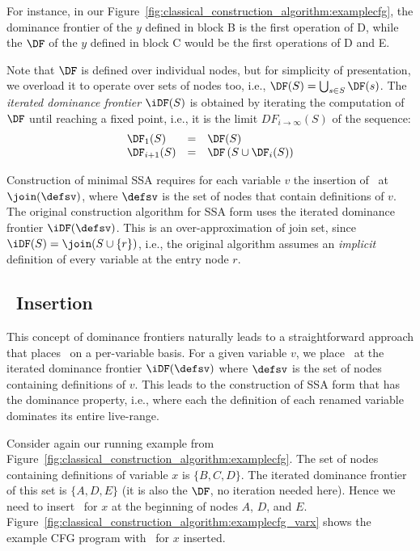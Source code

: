 {For instance, in our 
Figure~\ref{fig:classical_construction_algorithm:examplecfg}, the dominance 
frontier of the $y$ defined in block B is the first operation of D, while the 
$\DF$ of the $y$ defined in block C would be the first operations 
of D and E.


Note that $\DF$ is defined over individual nodes, 
but for simplicity of presentation, we overload it to 
operate over sets of nodes too, i.e., 
$\DF(S) = \bigcup_{s\in S} \DF(s)$.
The \textit{iterated dominance frontier} $\iDF(S)$ is obtained by iterating the computation of $\DF$ until 
reaching a fixed point, i.e., it is the limit 
$DF_{i\rightarrow\infty}(S)$
of the sequence:
$$\begin{array}{lll}
\DF_1(S) & = & \DF(S)\\
\DF_{i+1}(S) & = & \DF\left(S\cup \DF_i(S)\right)
\end{array}$$


Construction of minimal SSA 
requires for each variable $v$ the insertion of \phifuns\ at $\join(\defsv)$,
where $\defsv$ is the set of nodes that contain definitions of $v$.
The original construction algorithm
for SSA form uses the iterated dominance frontier $\iDF(\defsv)$.
This is an over-approximation of join set, since
$\iDF(S)=\join(S\cup \{r\})$,
i.e., the original algorithm assumes an \emph{implicit} definition of every
variable at the entry node $r$.


\subsection{\phifun\ Insertion}

This concept of dominance frontiers 
naturally leads to a
straightforward approach that places \phifuns\
on a per-variable basis.
For a given variable $v$, we place \phifuns\ at the
iterated dominance frontier $\iDF(\defsv)$ where
$\defsv$ is the set of nodes containing definitions of $v$.
This leads to the construction of SSA form that has 
the dominance property, i.e., where each the 
definition of each renamed variable dominates its entire live-range.

Consider again our running example from Figure~\ref{fig:classical_construction_algorithm:examplecfg}. The set of nodes containing definitions
of variable
$x$ is $\{ B,C,D \}$. The iterated dominance frontier of this set 
is $\{ A, D, E \}$ (it is also the $\DF$, no iteration needed here). Hence we need to insert 
\phifuns\ for $x$ at the beginning of nodes $A$, $D$, and $E$.
Figure~\ref{fig:classical_construction_algorithm:examplecfg_varx} shows the example CFG program
with \phifuns\ for $x$ inserted.

}
